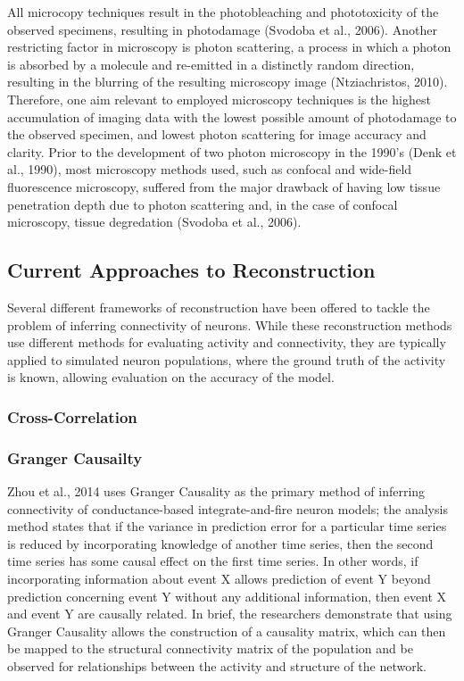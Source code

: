 \documentclass[11pt]{article}
\begin{document}
All microcopy techniques result in the photobleaching and phototoxicity of the observed specimens, resulting in photodamage (Svodoba et al., 2006). Another restricting factor in microscopy is photon scattering, a process in which a photon is absorbed by a molecule and re-emitted in a distinctly random direction, resulting in the blurring of the resulting microscopy image (Ntziachristos, 2010). Therefore, one aim relevant to employed microscopy techniques is the highest accumulation of imaging data with the lowest possible amount of photodamage to the observed specimen, and lowest photon scattering for image accuracy and clarity. Prior to the development of two photon microscopy in the 1990's (Denk et al., 1990), most microscopy methods used, such as confocal and wide-field fluorescence microscopy, suffered from the major drawback of having low tissue penetration depth due to photon scattering and, in the case of confocal microscopy, tissue degredation (Svodoba et al., 2006).

\subsection{Current Approaches to Reconstruction}
Several different frameworks of reconstruction have been offered to tackle the problem of inferring connectivity of neurons. While these reconstruction methods use different methods for evaluating activity and connectivity, they are typically applied to simulated neuron populations, where the ground truth of the activity is known, allowing evaluation on the accuracy of the model.\par

\subsubsection{Cross-Correlation}


\subsubsection{Granger Causailty}
Zhou et al., 2014 uses Granger Causality as the primary method of inferring connectivity of conductance-based integrate-and-fire neuron models; the analysis method states that if the variance in prediction error for a particular time series is reduced by incorporating knowledge of another time series, then the second time series has some causal effect on the first time series. In other words, if incorporating information about event X allows prediction of event Y beyond prediction concerning event Y without any additional information, then event X and event Y are causally related.  In brief, the researchers demonstrate that using Granger Causality allows the construction of a causality matrix, which can then be mapped to the structural connectivity matrix of the population and be observed for relationships between the activity and structure of the network.\par
\end{document}

